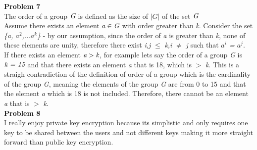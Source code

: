 \documentclass[10pt]{article}
\begin{document}
\noindent \large \textbf{Problem 7}\\
\indent The order of a group $\emph{G}$ is defined as the size of $|G|$ of the set $\emph{G}$\\
\indent Assume there exists an element $\emph{a} \in \emph{G}$ with order greater than \emph{k}. Consider the set \emph{\{a, $a^{2}$,...$a^{k}$\}} - by our assumption, since the order of \emph{a} is greater than \emph{k}, none of these elements are unity, therefore there exist \emph{i,j} $\leq$ \emph{k,i} $\neq$ \emph{j} such that \emph{$a^{i}$ = $a^{j}$}.\\
\indent If there exists an element $\emph{a} > \emph{k}$, for example lets say the order of a group \emph{G} is $\emph{k = 15}$ and that there exists an element \emph{a} that is 18, which is $>$ \emph{k}. This is a straigh contradiction of the definition of order of a group which is the cardinality of the group \emph{G}, meaning the elements of the group \emph{G} are from 0 to 15 and that the element \emph{a} which is 18 is not included. Therefore, there cannot be an element \emph{a} that is $>$ \emph{k}.\\ 


\noindent \large \textbf{Problem 8}\\
\indent I really enjoy private key encryption because its simplistic and only requires one key to be shared between the users and not different keys making it more straight forward than public key encryption.\\
\end{document}
